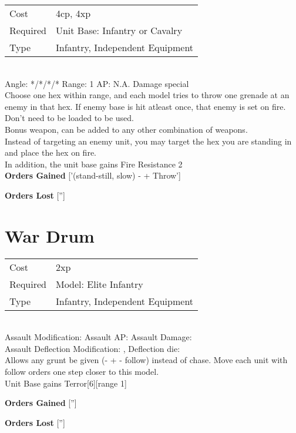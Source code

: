 \begin{tabular}{ll}
    Cost & 4cp, 4xp \\
    Required & Unit Base: Infantry or Cavalry\\
    Type & Infantry, Independent Equipment\\
\end{tabular}
\ \\
\indent Angle: */*/*/* Range: 1  AP: N.A. Damage special \\
Choose one hex within range, and each model tries to throw one grenade at an enemy in that hex. If enemy base is hit atleast once, that enemy is set on fire. \\ Don't need to be loaded to be used.\\ Bonus weapon, can be added to any other combination of weapons.\\ Instead of targeting an enemy unit, you may target the hex you are standing in and place the hex on fire.\\ In addition, the unit base gains Fire Resistance 2
\ \\

{\bf Orders Gained}
['(stand-still, slow) - + Throw']

{\bf Orders Lost}
['']
\section{ War Drum }

\begin{tabular}{ll}
    Cost & 2xp \\
    Required & Model: Elite Infantry\\
    Type & Infantry, Independent Equipment\\
\end{tabular}
\ \\
Assault Modification:  Assault AP:  Assault Damage: \\
Assault Deflection Modification: , Deflection die:  \\


Allows any grunt be given (- + - follow) instead of chase. Move each unit with follow orders one step closer to this model.\\ Unit Base gains Terror[6][range 1]

{\bf Orders Gained}
['']

{\bf Orders Lost}
['']

